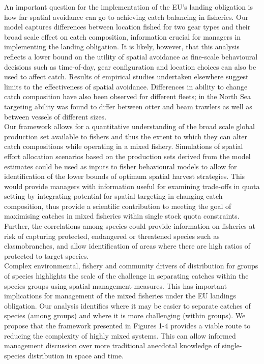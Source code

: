 \documentclass[fleqn,10pt]{wlscirep}
\begin{document}
\begin{linenumbers}
An important question for the implementation of the EU's landing obligation is
how far spatial avoidance can go to achieving catch balancing in fisheries.
Our model captures differences between location fished for two gear types and
their broad scale effect on catch composition, information crucial for managers
in implementing the landing obligation.  It is likely, however, that this analysis
reflects a lower bound on the utility of spatial avoidance as fine-scale
behavioural decisions such as time-of-day, gear configuration and location
choices can also be used to affect catch\cite{Abbott2015, Thorson2016}. Results
of empirical studies undertaken elsewhere\cite{Branch2008, Kuriyama2016}
suggest limits to the effectiveness of spatial avoidance. Differences in
ability to change catch composition have also been observed for different
fleets; in the North Sea targeting ability was found to differ between otter
and beam trawlers as well as between vessels of different
sizes\cite{Pascoe2007}.  \\

Our framework allows for a quantitative understanding of the broad scale global
production set available to fishers\cite{Reimer2017} and thus the extent to
which they can alter catch compositions while operating in a mixed fishery.
Simulations of spatial effort allocation scenarios based on the production sets
derived from the model estimates could be used as inputs to fisher behavioural
models to allow for identification of the lower bounds of optimum spatial
harvest strategies. This would provide managers with information useful for
examining trade-offs in quota setting by integrating potential for spatial
targeting in changing catch composition, thus provide a scientific contribution
to meeting the goal of maximising catches in mixed fisheries within single
stock quota constraints\cite{Ulrich2016}. Further, the correlations among
species could provide information on fisheries at risk of capturing protected,
endangered or threatened species such as elasmobranches, and allow
identification of areas where there are high ratios of protected to target
species.\\


Complex environmental, fishery and community drivers of distribution for groups
of species highlights the scale of the challenge in separating catches within
the species-groups using spatial management measures. This has important
implications for management of the mixed fisheries under the EU landings
obligation. Our analysis identifies where it may be easier to separate
catches of species (among groups) and where it is more challenging (within
groups). We propose that the framework presented in Figures 1-4 provides
a viable route to reducing the complexity of highly mixed systems. 
This can allow informed management discussion over more
traditional anecdotal knowledge of single-species distribution in space and
time.\\



\end{linenumbers}
\end{document}
